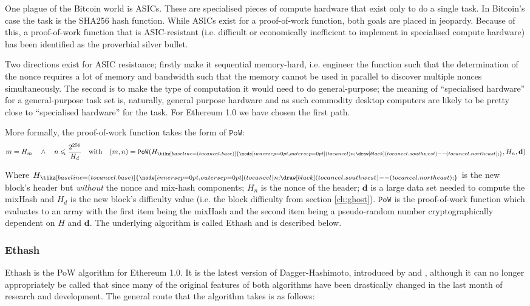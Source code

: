 \documentclass[9pt,oneside]{amsart}
\newcommand{\hcancel}[1]{%
    \tikz[baseline=(tocancel.base)]{
        \node[inner sep=0pt,outer sep=0pt] (tocancel) {#1};
        \draw[black] (tocancel.south west) -- (tocancel.north east);
    }%
}%
\begin{document}
\begin{multicols}{2}
One plague of the Bitcoin world is ASICs. These are specialised pieces of compute hardware that exist only to do a single task. In Bitcoin's case the task is the SHA256 hash function. While ASICs exist for a proof-of-work function, both goals are placed in jeopardy. Because of this, a proof-of-work function that is ASIC-resistant (i.e. difficult or economically inefficient to implement in specialised compute hardware) has been identified as the proverbial silver bullet.

Two directions exist for ASIC resistance; firstly make it sequential memory-hard, i.e. engineer the function such that the determination of the nonce requires a lot of memory and bandwidth such that the memory cannot be used in parallel to discover multiple nonces simultaneously. The second is to make the type of computation it would need to do general-purpose; the meaning of ``specialised hardware''  for a general-purpose task set is, naturally, general purpose hardware and as such commodity desktop computers are likely to be pretty close to ``specialised hardware'' for the task. For Ethereum 1.0 we have chosen the first path.

More formally, the proof-of-work function takes the form of $\mathtt{PoW}$:
\begin{equation}
m = H_m \quad \wedge \quad n \leqslant \frac{2^{256}}{H_d} \quad \text{with} \quad (m, n) = \mathtt{PoW}(H_{\hcancel{n}}, H_n, \mathbf{d})
\end{equation}

Where $H_{\hcancel{n}}$ is the new block's header but \textit{without} the nonce and mix-hash components; $H_n$ is the nonce of the header; $\mathbf{d}$ is a large data set needed to compute the mixHash and $H_d$ is the new block's difficulty value (i.e. the block difficulty from section \ref{ch:ghost}). $\mathtt{PoW}$ is the proof-of-work function which evaluates to an array with the first item being the mixHash and the second item being a pseudo-random number cryptographically dependent on $H$ and $\mathbf{d}$. The underlying algorithm is called Ethash and is described below.
\subsubsection{Ethash}
Ethash is the PoW algorithm for Ethereum 1.0. It is the latest version of Dagger-Hashimoto, introduced by \cite{dagger} and \cite{hashimoto}, although it can no longer appropriately be called that since many of the original features of both algorithms have been drastically changed in the last month of research and development. The general route that the algorithm takes is as follows:


\end{multicols}
\end{document}
